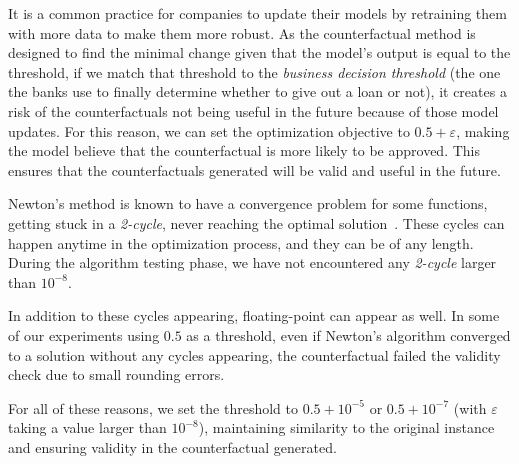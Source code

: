 \documentclass[12pt]{extarticle}
\numberwithin{equation}{section}
\begin{document}
It is a common practice for companies to update their models by retraining them with more data to make them more robust. As the counterfactual method is designed to find the minimal change given that the model's output is equal to the threshold, if we match that threshold to the \emph{business decision threshold} (the one the banks use to finally determine whether to give out a loan or not), it creates a risk of the counterfactuals not being useful in the future because of those model updates. For this reason, we can set the optimization objective to $0.5 + \varepsilon$, making the model believe that the counterfactual is more likely to be approved. This ensures that the counterfactuals generated will be valid and useful in the future.


Newton's method is known to have a convergence problem for some functions, getting stuck in a \emph{2-cycle}, never reaching the optimal solution~\cite{ypmanewton}. These cycles can happen anytime in the optimization process, and they can be of any length. During the algorithm testing phase, we have not encountered any \emph{2-cycle} larger than $10^{-8}$.

In addition to these cycles appearing, floating-point can appear as well. In some of our experiments using $0.5$ as a threshold, even if Newton's algorithm converged to a solution without any cycles appearing, the counterfactual failed the validity check due to small rounding errors.

For all of these reasons, we set the threshold to $0.5 + 10^{-5}$ or $0.5 + 10^{-7}$ (with $\varepsilon$ taking a value larger than $10^{-8}$), maintaining similarity to the original instance and ensuring validity in the counterfactual generated. 

\end{document}
